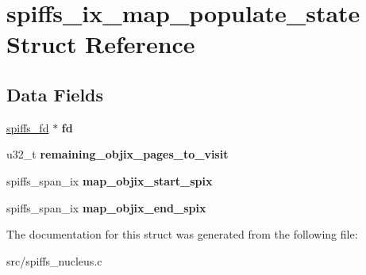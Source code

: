 \hypertarget{structspiffs__ix__map__populate__state}{}\section{spiffs\+\_\+ix\+\_\+map\+\_\+populate\+\_\+state Struct Reference}
\label{structspiffs__ix__map__populate__state}
\subsection*{Data Fields}
\begin{DoxyCompactItemize}
\item 
\mbox{\label{structspiffs__ix__map__populate__state_a969374b8470b7c3bc58d96b37b540e9b}} 
\mbox{\hyperlink{structspiffs__fd}{spiffs\+\_\+fd}} $\ast$ {\bfseries fd}
\item 
\mbox{\label{structspiffs__ix__map__populate__state_a2eaf00d6dda8e323eeb1645785057830}} 
u32\+\_\+t {\bfseries remaining\+\_\+objix\+\_\+pages\+\_\+to\+\_\+visit}
\item 
\mbox{\label{structspiffs__ix__map__populate__state_aad6e0a21c02c01a12340e33467142a2a}} 
spiffs\+\_\+span\+\_\+ix {\bfseries map\+\_\+objix\+\_\+start\+\_\+spix}
\item 
\mbox{\label{structspiffs__ix__map__populate__state_af30d4a5056b0f66e9f6af54303832b1a}} 
spiffs\+\_\+span\+\_\+ix {\bfseries map\+\_\+objix\+\_\+end\+\_\+spix}
\end{DoxyCompactItemize}


The documentation for this struct was generated from the following file\+:\begin{DoxyCompactItemize}
\item 
src/spiffs\+\_\+nucleus.\+c\end{DoxyCompactItemize}
